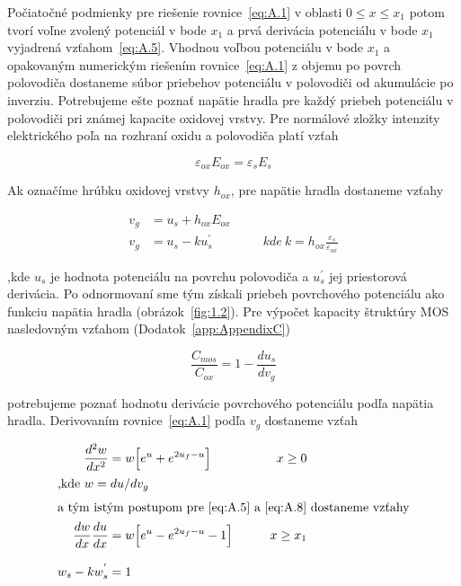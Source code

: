  Počiatočné podmienky pre riešenie rovnice~\ref{eq:A.1} v oblasti
 ${0\leq{x}\leq{x_1}}$ potom tvorí voľne zvolený potenciál v bode
 $x_1$ a prvá derivácia potenciálu v bode $x_1$ vyjadrená
 vzťahom~\ref{eq:A.5}. Vhodnou voľbou potenciálu v bode $x_1$ a
 opakovaným numerickým riešením rovnice~\ref{eq:A.1} z objemu po
 povrch polovodiča dostaneme súbor priebehov potenciálu v polovodiči
 od akumulácie po inverziu. Potrebujeme ešte poznať napätie hradla pre
 každý priebeh potenciálu v polovodiči pri známej kapacite oxidovej
 vrstvy.  Pre normálové zložky intenzity elektrického poľa na rozhraní
 oxidu a polovodiča platí vzťah

\begin{equation}\label{eq:A.6}
  \varepsilon_{ox}E_{ox} = \varepsilon_s{E_s}
\end{equation}

Ak označíme hrúbku oxidovej vrstvy $h_{ox}$, pre napätie hradla
dostaneme vzťahy

\begin{align}
  v_g &= u_s + h_{ox}E_{ox} \label{eq:A.7} \\
  v_g &= u_s - ku_{s}^{'} \qquad\qquad kde\ {k = h_{ox}\frac{\varepsilon_s}{\varepsilon_{ox}}} \label{eq:A.8}
\end{align}

,kde $u_s$ je hodnota potenciálu na povrchu polovodiča a $u_{s}^{'}$
jej priestorová derivácia. Po odnormovaní sme tým získali priebeh
povrchového potenciálu ako funkciu napätia hradla
(obrázok~\ref{fig:1.2}). Pre výpočet kapacity štruktúry MOS
nasledovným vzťahom (Dodatok~\ref{app:AppendixC})

\begin{equation}\label{eq:A.9}
  \frac{C_{mos}}{C_{ox}} = 1 - \frac{du_s}{dv_g}
\end{equation}

potrebujeme poznať hodnotu derivácie povrchového potenciálu podľa
napätia hradla. Derivovaním rovnice~\ref{eq:A.1} podľa $v_g$ dostaneme
vzťah

\begin{samepage}
\begin{subequations}\label{eq:A.10}
  \begin{align}
    \frac{d^{2}w}{dx^2} &= w \Big[e^u + e^{2u_f-u}\Big] \qquad &{x\ge{0}} \label{eq:A.10a} \\
    \intertext{,kde\ $w={du}/{dv_g}$}
    \intertext{a tým istým postupom pre~\ref{eq:A.5} a~\ref{eq:A.8} dostaneme vzťahy}
    \frac{dw}{dx}\frac{du}{dx} &= w \Big[e^u - e^{2u_f-u} - 1\Big] \qquad &{x\ge{x_1}} \label{eq:A.10b} \\[0.3cm]
    w_s - kw_s^{'} &= 1 \label{eq:A.10c}
  \end{align}
\end{subequations}
\end{samepage}

